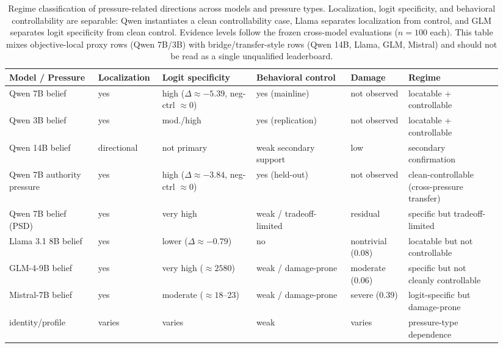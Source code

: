 \documentclass[11pt]{article}
\begin{document}
\begin{table}[t]
  \centering
  \small
  \begin{tabular}{L{0.17\linewidth} L{0.12\linewidth} L{0.18\linewidth} L{0.18\linewidth} L{0.11\linewidth} L{0.18\linewidth}}
    \toprule
    Model / Pressure & Localization & Logit specificity & Behavioral control & Damage & Regime \\
    \midrule
    Qwen 7B belief & yes & high (\(\Delta \approx -5.39\), neg-ctrl \(\approx 0\)) & yes (mainline) & not observed & locatable + controllable \\
    Qwen 3B belief & yes & mod./high & yes (replication) & not observed & locatable + controllable \\
    Qwen 14B belief & directional & not primary & weak secondary support & low & secondary confirmation \\
    Qwen 7B authority pressure & yes & high (\(\Delta \approx -3.84\), neg-ctrl \(\approx 0\)) & yes (held-out) & not observed & clean-controllable (cross-pressure transfer) \\
    Qwen 7B belief (PSD) & yes & very high & weak / tradeoff-limited & residual & specific but tradeoff-limited \\
    Llama 3.1 8B belief & yes & lower (\(\Delta \approx -0.79\)) & no & nontrivial (0.08) & locatable but not controllable \\
    GLM-4-9B belief & yes & very high (\(\approx 2580\)) & weak / damage-prone & moderate (0.06) & specific but not cleanly controllable \\
    Mistral-7B belief & yes & moderate (\(\approx 18\)--23) & weak / damage-prone & severe (0.39) & logit-specific but damage-prone \\
    identity/profile & varies & varies & weak & varies & pressure-type dependence \\
    \bottomrule
  \end{tabular}
  \caption{Regime classification of pressure-related directions across models and pressure types. Localization, logit specificity, and behavioral controllability are separable: Qwen instantiates a clean controllability case, Llama separates localization from control, and GLM separates logit specificity from clean control. Evidence levels follow the frozen cross-model evaluations (\(n=100\) each). This table mixes objective-local proxy rows (Qwen 7B/3B) with bridge/transfer-style rows (Qwen 14B, Llama, GLM, Mistral) and should not be read as a single unqualified leaderboard.}
  \label{tab:regime}
\end{table}
\end{document}
